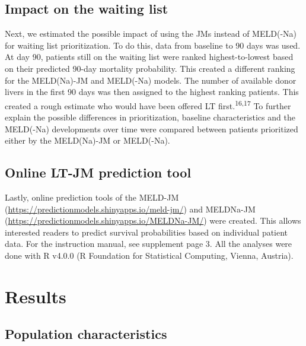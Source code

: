 \documentclass[11pt,english,]{book} %
\begin{document}
\hypertarget{impact-on-the-waiting-list-2}{%
\subsection*{Impact on the waiting list}\label{impact-on-the-waiting-list-2}}

Next, we estimated the possible impact of using the JMs instead of MELD(-Na) for waiting list prioritization. To do this, data from baseline to 90 days was used. At day 90, patients still on the waiting list were ranked highest-to-lowest based on their predicted 90-day mortality probability. This created a different ranking for the MELD(Na)-JM and MELD(-Na) models. The number of available donor livers in the first 90 days was then assigned to the highest ranking patients. This created a rough estimate who would have been offered LT first.\textsuperscript{16,17} To further explain the possible differences in prioritization, baseline characteristics and the MELD(-Na) developments over time were compared between patients prioritized either by the MELD(Na)-JM or MELD(-Na).

\hypertarget{online-lt-jm-prediction-tool}{%
\subsection*{Online LT-JM prediction tool}\label{online-lt-jm-prediction-tool}}

Lastly, online prediction tools of the MELD-JM (\url{https://predictionmodels.shinyapps.io/meld-jm/}) and MELDNa-JM (\url{https://predictionmodels.shinyapps.io/MELDNa-JM/}) were created. This allows interested readers to predict survival probabilities based on individual patient data. For the instruction manual, see supplement page 3. All the analyses were done with R v4.0.0 (R Foundation for Statistical Computing, Vienna, Austria).

\hypertarget{results-2}{%
\section*{Results}\label{results-2}}

\hypertarget{population-characteristics}{%
\subsection*{Population characteristics}\label{population-characteristics}}
\end{document}
